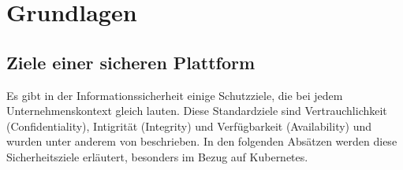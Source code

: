 \newpage
\section{Grundlagen} \label{grundlagen}

\subsection{Ziele einer sicheren Plattform}

Es gibt in der Informationssicherheit einige Schutzziele, die bei jedem
Unternehmenskontext gleich lauten. Diese Standardziele sind Vertrauchlichkeit
(Confidentiality), Intigrität (Integrity) und Verfügbarkeit (Availability) und
wurden unter anderem von \cite[Vgl.][S. 230 f.]{nist.SP-800-160v1} beschrieben.
In den folgenden Absätzen werden diese Sicherheitsziele erläutert, besonders im
Bezug auf Kubernetes.

